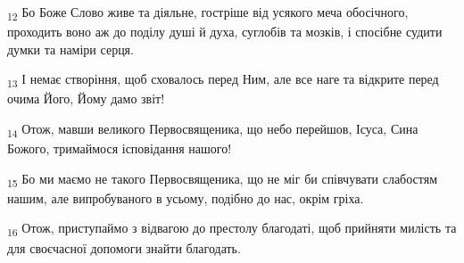 \begin{tcolorbox}
\textsubscript{12} Бо Боже Слово живе та діяльне, гостріше від усякого меча обосічного, проходить воно аж до поділу душі й духа, суглобів та мозків, і спосібне судити думки та наміри серця.
\end{tcolorbox}
\begin{tcolorbox}
\textsubscript{13} І немає створіння, щоб сховалось перед Ним, але все наге та відкрите перед очима Його, Йому дамо звіт!
\end{tcolorbox}
\begin{tcolorbox}
\textsubscript{14} Отож, мавши великого Первосвященика, що небо перейшов, Ісуса, Сина Божого, тримаймося ісповідання нашого!
\end{tcolorbox}
\begin{tcolorbox}
\textsubscript{15} Бо ми маємо не такого Первосвященика, що не міг би співчувати слабостям нашим, але випробуваного в усьому, подібно до нас, окрім гріха.
\end{tcolorbox}
\begin{tcolorbox}
\textsubscript{16} Отож, приступаймо з відвагою до престолу благодаті, щоб прийняти милість та для своєчасної допомоги знайти благодать.
\end{tcolorbox}
